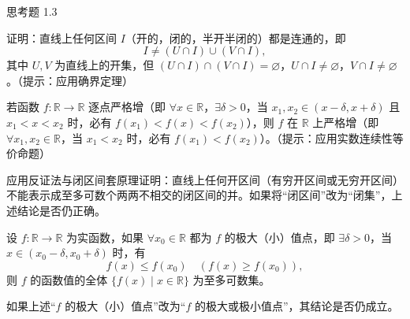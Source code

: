 \begin{exblock}{思考题 1.3}
\item 证明：直线上任何区间 $I$（开的，闭的，半开半闭的）都是连通的，即
\[
I \neq (U \cap I) \cup (V \cap I),
\]
其中 $U, V$ 为直线上的开集，但 $(U \cap I) \cap (V \cap I) = \varnothing$，$U \cap I \neq \varnothing$，$V \cap I \neq \varnothing$。（提示：应用确界定理）

\item 若函数 $f: \mathbb{R} \to \mathbb{R}$ 逐点严格增（即 $\forall x \in \mathbb{R}$，$\exists \delta > 0$，当 $x_1, x_2 \in (x - \delta, x + \delta)$ 且 $x_1 < x < x_2$ 时，必有 $f(x_1) < f(x) < f(x_2)$），则 $f$ 在 $\mathbb{R}$ 上严格增（即 $\forall x_1, x_2 \in \mathbb{R}$，当 $x_1 < x_2$ 时，必有 $f(x_1) < f(x_2)$）。（提示：应用实数连续性等价命题）

\item 应用反证法与闭区间套原理证明：直线上任何开区间（有穷开区间或无穷开区间）不能表示成至多可数个两两不相交的闭区间的并。如果将“闭区间”改为“闭集”，上述结论是否仍正确。

\item 设 $f: \mathbb{R} \to \mathbb{R}$ 为实函数，如果 $\forall x_0 \in \mathbb{R}$ 都为 $f$ 的极大（小）值点，即 $\exists \delta > 0$，当 $x \in (x_0 - \delta, x_0 + \delta)$ 时，有
\[
f(x) \leqslant f(x_0)\quad (f(x) \geqslant f(x_0)),
\]
则 $f$ 的函数值的全体 $\{f(x) \mid x \in \mathbb{R}\}$ 为至多可数集。

如果上述“$f$ 的极大（小）值点”改为“$f$ 的极大或极小值点”，其结论是否仍成立。
\end{exblock}
